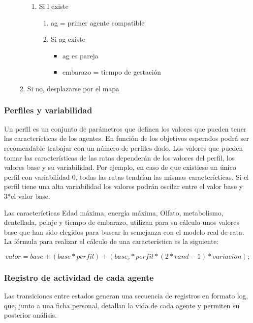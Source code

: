 \begin{enumerate}
\begin{enumerate}
\begin{enumerate}
   \item Si l existe
   \begin{enumerate}
    \item ag = primer agente compatible
    \item Si ag existe
    \begin{itemize}
     \item ag es pareja
     \item embarazo = tiempo de gestación
    \end{itemize}
   \end{enumerate}
  \end{enumerate}
  \item Si no, desplazarse por el mapa
 \end{enumerate}
\end{enumerate}






\subsubsection{Perfiles y variabilidad}

Un perfil es un conjunto de parámetros que definen los valores que pueden tener
las caracterícticas de los agentes. En función de los objetivos esperados podrá
ser recomendable trabajar con un número de perfiles dado. Los valores que
pueden tomar las características de las ratas dependerán de los valores del
perfil, los valores base y su variabilidad. Por ejemplo, en caso de que
existiese un único perfil con variabilidad 0, todas las ratas tendrían las
mismas caracterícticas. Si el perfil tiene una alta variabilidad los valores
podrán oscilar entre el valor base y 3*el valor base.

Las caracterícticas Edad máxima, energía máxima, Olfato, metabolismo,
dentellada, pelaje y tiempo de embarazo, utilizan para su cálculo unos valores
base que han sido elegidos para buscar la semejanza con el modelo real de rata.
La fórmula para realizar el cálculo de una característica es la siguiente:

$$ valor = base 
                + (base * perfil)
                + (base_c * perfil * ( 2*rand - 1) * variacion);
$$


\subsubsection{Registro de actividad de cada agente}

Las transiciones entre estados generan una secuencia de registros en formato
log, que, junto a una ficha personal, detallan la vida de cada agente y permiten
su posterior análisis.

